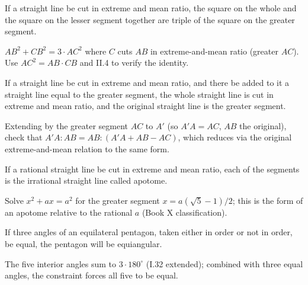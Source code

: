 \documentclass{rrxiv}
\begin{document}
\begin{claim}
\label{prop:XIII.4}
If a straight line be cut in extreme and mean ratio, the square on
the whole and the square on the lesser segment together are triple
of the square on the greater segment.
\end{claim}
\begin{evidence}
\label{ev:XIII.4}
$AB^2 + CB^2 = 3 \cdot AC^2$ where $C$ cuts $AB$ in extreme-and-mean
ratio (greater $AC$).  Use $AC^2 = AB \cdot CB$ and II.4 to verify
the identity.
\end{evidence}

\begin{claim}
\label{prop:XIII.5}
If a straight line be cut in extreme and mean ratio, and there be
added to it a straight line equal to the greater segment, the whole
straight line is cut in extreme and mean ratio, and the original
straight line is the greater segment.
\end{claim}
\begin{evidence}
\label{ev:XIII.5}
Extending by the greater segment $AC$ to $A'$ (so $A'A = AC$, $AB$
the original), check that $A'A : AB = AB : (A'A + AB - AC)$, which
reduces via the original extreme-and-mean relation to the same form.
\end{evidence}

\begin{claim}
\label{prop:XIII.6}
If a rational straight line be cut in extreme and mean ratio, each of
the segments is the irrational straight line called apotome.
\end{claim}
\begin{evidence}
\label{ev:XIII.6}
Solve $x^2 + ax = a^2$ for the greater segment $x = a(\sqrt{5} -
1)/2$; this is the form of an apotome relative to the rational $a$
(Book X classification).
\end{evidence}

\begin{claim}
\label{prop:XIII.7}
If three angles of an equilateral pentagon, taken either in order or
not in order, be equal, the pentagon will be equiangular.
\end{claim}
\begin{evidence}
\label{ev:XIII.7}
The five interior angles sum to $3 \cdot 180^\circ$ (I.32 extended);
combined with three equal angles, the constraint forces all five to
be equal.
\end{evidence}
\end{document}
